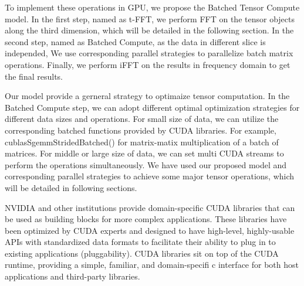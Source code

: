 \documentclass[format=acmsmall, review=false, screen=true]{acmart}
\begin{document}
To implement these operations in GPU, we propose the Batched Tensor Compute model. In the first step, named as t-FFT, we perform FFT on the tensor objects along the third dimension, which will be detailed in the following section. In the second step, named as Batched Compute, as the data in different slice is independed, We use corresponding parallel strategies to parallelize batch matrix operations. Finally, we perform iFFT on the results in frequency domain to get the final results.

Our model provide a gerneral strategy to optimaize tensor computation. In the Batched Compute step, we can adopt different optimal optimization strategies for different data sizes and operations. For small size of data, we can utilize the corresponding batched functions provided by CUDA libraries. For example, cublasSgemmStridedBatched() for matrix-matix multiplication of a batch of matrices. For middle or large size of data, we can set multi CUDA streams to perform the operations simultaneously. We have used our proposed model and corresponding parallel strategies to achieve some major tensor operations, which will be detailed in following sections.

NVIDIA and other institutions provide domain-specific CUDA libraries that can be used as building blocks for more complex applications. These
libraries have been optimized by CUDA experts and designed to have high-level, highly-usable APIs with standardized data formats to facilitate their ability to plug in to existing applications
(pluggability). CUDA libraries sit on top of the CUDA runtime, providing a simple, familiar, and
domain-specifi c interface for both host applications and third-party libraries.

\end{document}
